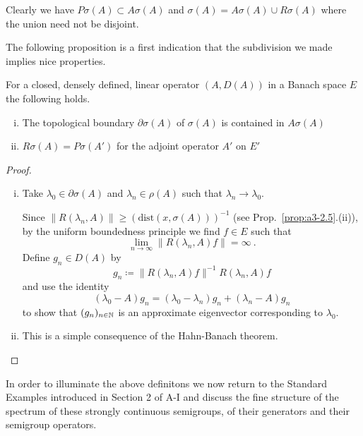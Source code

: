 Clearly we have $P\sigma(A) \subset A\sigma(A)$ and $\sigma(A) = A\sigma(A) \cup R\sigma(A)$ where the union need not be disjoint.

The following proposition is a first indication that the subdivision we made implies nice properties.
\begin{proposition}\label{prop:a3-2.2}
For a closed, densely defined, linear operator $(A,D(A))$ in a Banach space $E$ the following holds.
\begin{enumerate}[(i)]

\item
The topological boundary $\partial\sigma(A)$ of $\sigma(A)$ is contained in $A\sigma(A)$

\item
$R\sigma(A) = P\sigma(A')$ for the adjoint operator $A'$ on $E'$

\end{enumerate}
\end{proposition}
\begin{proof}
\begin{enumerate}[(i), wide]

\item 
Take $\lambda_{0} \in \partial\sigma(A)$ and $\lambda_{n} \in \rho(A)$ such that $\lambda_{n} \to \lambda_{0}$.

Since $\|R(\lambda_{n},A)\| \geq (\text{dist}(x,\sigma(A)))^{-1}$ (see Prop.~\ref{prop:a3-2.5}.(ii)), by the uniform boundedness principle we find $f \in E$ such that
\[
\lim_{n \to \infty}\|R(\lambda_n ,A)f\| = \infty~.
\]
Define $g_{n} \in D(A)$ by
\[
g_{n} \coloneqq \|R(\lambda_{n},A)f\|^{-1} R(\lambda_{n},A)f
\]
and use the identity
\[
(\lambda_{0} - A)g_{n} = (\lambda_{0} - \lambda_{n})g_{n} + (\lambda_{n} - A)g_{n}
\]
to show that $(g_{n})_{n \in \mathbb{N}}$ is an approximate eigenvector corresponding to $\lambda_{0}$.

\item 
This is a simple consequence of the Hahn-Banach theorem.
\end{enumerate}
\end{proof}
In order to illuminate the above definitons we now return to the Standard Examples introduced in Section 2 of A-I and discuss the fine structure of the spectrum of these strongly continuous semigroups, \ie of their generators and their semigroup operators.
